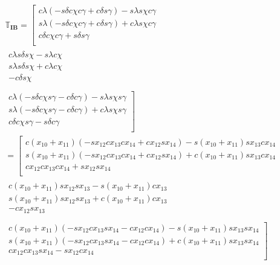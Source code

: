 \begin{multline} \label{eq:IBtrans}
\mathbb{T}_{\mathbf{IB}}=
\left[
\begin{matrix}
c\lambda\left(-s\delta c\chi c\gamma +c\delta s\gamma \right)-s\lambda s\chi c\gamma    \\
s\lambda\left(-s\delta c\chi c\gamma +c\delta s\gamma \right)+c\lambda s\chi c\gamma   \\
c\delta c\chi c\gamma +s\delta s\gamma    \\
\end{matrix}  \right.
\\
\begin{matrix}
c\lambda s\delta s\chi -s\lambda c\chi\\
s\lambda s\delta s\chi +c\lambda c\chi \\
 -c\delta s\chi \\
\end{matrix}
\\
\left.
\begin{matrix}
c\lambda\left(-s\delta c\chi s\gamma -c\delta c\gamma \right)-s\lambda s\chi s\gamma\\
s\lambda\left(-s\delta c\chi s\gamma -c\delta c\gamma \right)+c\lambda s\chi s\gamma \\
c\delta c\chi s\gamma -s\delta c\gamma\\
\end{matrix}
\right]\\
=
\left[
\begin{matrix}
c\left(x_{10}+x_{11}\right)\left(-sx_{12} cx_{13} cx_{14} +cx_{12} sx_{14} \right)-s\left(x_{10}+x_{11}\right) sx_{13} cx_{14}    \\
s\left(x_{10}+x_{11}\right)\left(-sx_{12} cx_{13} cx_{14} +cx_{12} sx_{14} \right)+c\left(x_{10}+x_{11}\right) sx_{13} cx_{14}    \\
cx_{12} cx_{13} cx_{14} +sx_{12} sx_{14}   \\
\end{matrix} \right.
\\
\begin{matrix}
c\left(x_{10}+x_{11}\right) sx_{12} sx_{13} -s\left(x_{10}+x_{11}\right) cx_{13} \\
s\left(x_{10}+x_{11}\right) sx_{12} sx_{13} +c\left(x_{10}+x_{11}\right) cx_{13} \\
-cx_{12} sx_{13} \\
\end{matrix}
\\
\left.
\begin{matrix}
c\left(x_{10}+x_{11}\right)\left(-sx_{12} cx_{13} sx_{14} -cx_{12} cx_{14} \right)-s\left(x_{10}+x_{11}\right) sx_{13} sx_{14} \\
s\left(x_{10}+x_{11}\right)\left(-sx_{12} cx_{13} sx_{14} -cx_{12} cx_{14} \right)+c\left(x_{10}+x_{11}\right) sx_{13} sx_{14} \\
 cx_{12} cx_{13} sx_{14} -sx_{12} cx_{14} \\
\end{matrix}
\right]\\
\end{multline}


